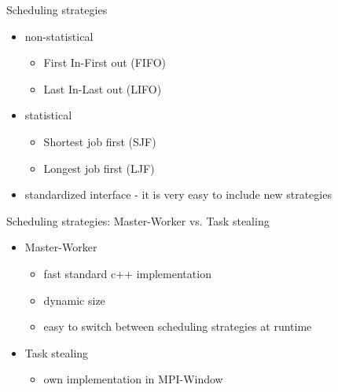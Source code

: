	\begin{frame}{Scheduling strategies}
		\begin{itemize}
		\item non-statistical
		\begin{itemize}
			\item First In-First out (FIFO)
			\item Last In-Last out (LIFO)
		\end{itemize}
		\item statistical
		\begin{itemize}
			\item Shortest job first (SJF)
			\item Longest job first (LJF)
		\end{itemize}
		\item standardized interface - it is very easy to include new strategies
		\end{itemize}
	\end{frame}
	\begin{frame}{Scheduling strategies: Master-Worker vs. Task stealing}
		\begin{itemize}
			\item Master-Worker
				\begin{itemize}
					\item fast standard c++ implementation
					\item dynamic size
					\item easy to switch between scheduling strategies at runtime	
				\end{itemize}
			
			\item Task stealing
					\begin{itemize}
						\item own implementation in MPI-Window
					\end{itemize}
			
		\end{itemize}
	\end{frame}